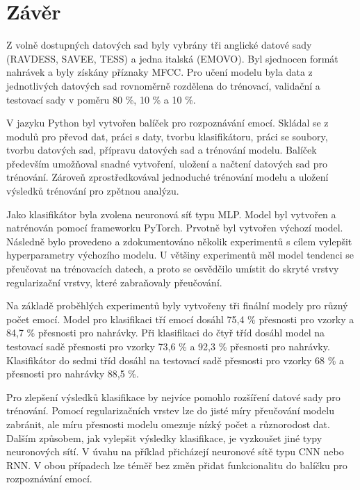 \documentclass[FM,BP]{tulthesis}
\begin{document}
\chapter{Závěr} %

Z volně dostupných datových sad byly vybrány tři anglické datové sady (RAVDESS, SAVEE, TESS) a jedna italská (EMOVO). Byl sjednocen formát nahrávek a byly získány příznaky MFCC. Pro učení modelu byla data z jednotlivých datových sad rovnoměrně rozdělena do trénovací, validační a testovací sady v poměru 80 \%, 10 \% a 10 \%.

V jazyku Python byl vytvořen balíček pro rozpoznávání emocí. Skládal se z modulů pro převod dat, práci s daty, tvorbu klasifikátoru, práci se soubory, tvorbu datových sad, přípravu datových sad a trénování modelu. Balíček především umožňoval snadné vytvoření, uložení a načtení datových sad pro trénování. Zároveň zprostředkovával jednoduché trénování modelu a uložení výsledků trénování pro zpětnou analýzu.

Jako klasifikátor byla zvolena neuronová síť typu MLP. Model byl vytvořen a natrénován pomocí frameworku PyTorch. Prvotně byl vytvořen výchozí model. Následně bylo provedeno a zdokumentováno několik experimentů s cílem vylepšit hyperparametry výchozího modelu. U většiny experimentů měl model tendenci se přeučovat na trénovacích datech, a proto se osvědčilo umístit do skryté vrstvy regularizační vrstvy, které zabraňovaly přeučování.

Na základě proběhlých experimentů byly vytvořeny tři finální modely pro různý počet emocí. Model pro klasifikaci tří emocí dosáhl 75,4 \% přesnosti pro vzorky a 84,7 \% přesnosti pro nahrávky. Při klasifikaci do čtyř tříd dosáhl model na testovací sadě přesnosti pro vzorky 73,6 \% a 92,3 \% přesnosti pro nahrávky. Klasifikátor do sedmi tříd dosáhl na testovací sadě přesnosti pro vzorky 68 \% a přesnosti pro nahrávky 88,5 \%.

Pro zlepšení výsledků klasifikace by nejvíce pomohlo rozšíření datové sady pro trénování. Pomocí regularizačních vrstev lze do jisté míry přeučování modelu zabránit, ale míru přesnosti modelu omezuje nízký počet a různorodost dat. Dalším způsobem, jak vylepšit výsledky klasifikace, je vyzkoušet jiné typy neuronových sítí. V úvahu na příklad přicházejí neuronové sítě typu CNN nebo RNN. V obou případech lze téměř bez změn přidat funkcionalitu do balíčku pro rozpoznávání emocí.

\nocite{*}
\printbibliography[title={Použitá literatura}] %
\end{document}
